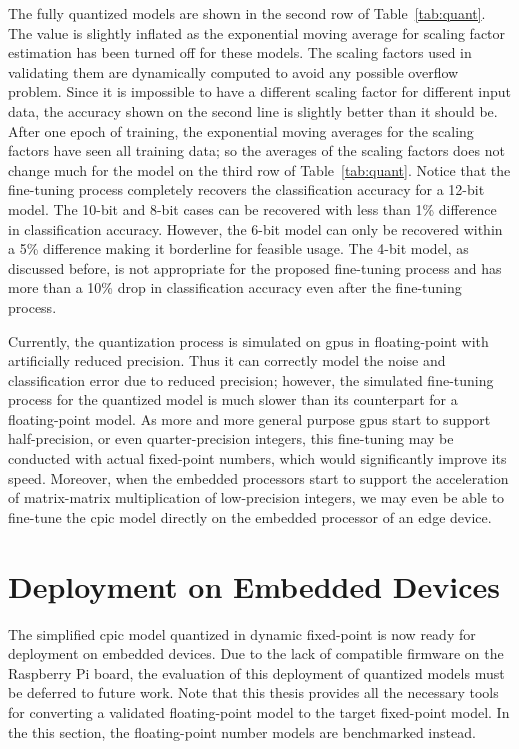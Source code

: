 \documentclass{article}
\begin{document}
The fully quantized models are shown in the second row of Table~\ref{tab:quant}.
The value is slightly inflated as the exponential moving average for scaling factor estimation has been turned off for these models.
The scaling factors used in validating them are dynamically computed to avoid any possible overflow problem.
Since it is impossible to have a different scaling factor for different input data, the accuracy shown on the second line is slightly better than it should be.
After one epoch of training, the exponential moving averages for the scaling factors have seen all training data; so the averages of the scaling factors does not change much for the model on the third row of Table~\ref{tab:quant}.
Notice that the fine-tuning process completely recovers the classification accuracy for a 12-bit model.
The 10-bit and 8-bit cases can be recovered with less than 1\% difference in classification accuracy.
However, the 6-bit model can only be recovered within a 5\% difference making it borderline for feasible usage.
The 4-bit model, as discussed before, is not appropriate for the proposed fine-tuning process and has more than a 10\% drop in classification accuracy even after the fine-tuning process.

Currently, the quantization process is simulated on \glspl{gpu} in floating-point with artificially reduced precision.
Thus it can correctly model the noise and classification error due to reduced precision; however, the simulated fine-tuning process for the quantized model is much slower than its counterpart for a floating-point model.
As more and more general purpose \glspl{gpu} start to support half-precision, or even quarter-precision integers, this fine-tuning may be conducted with actual fixed-point numbers, which would significantly improve its speed.
Moreover, when the embedded processors start to support the acceleration of matrix-matrix multiplication of low-precision integers, we may even be able to fine-tune the \gls{cpic} model directly on the embedded processor of an edge device.

\section{Deployment on Embedded Devices}
\label{sec:rbp}
%
The simplified \gls{cpic} model quantized in dynamic fixed-point is now ready for deployment on embedded devices.
Due to the lack of compatible firmware on the Raspberry Pi board, the evaluation of this deployment of quantized models must be deferred to future work.
Note that this thesis provides all the necessary tools for converting a validated floating-point model to the target fixed-point model.
In the this section, the floating-point number models are benchmarked instead.
\end{document}
